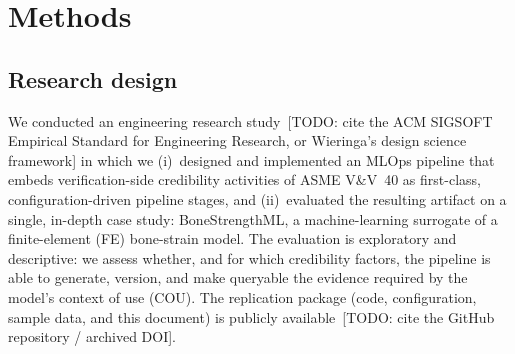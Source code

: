 %
%

\section{Methods}
\label{sec:methods}

\subsection{Research design}
\label{sec:methods:design}

We conducted an engineering research study~[TODO: cite the ACM SIGSOFT
Empirical Standard for Engineering Research, or Wieringa's design science
framework] in which we (i)~designed and implemented an MLOps pipeline that
embeds verification-side credibility activities of ASME V\&V~40 as
first-class, configuration-driven pipeline stages, and (ii)~evaluated the
resulting artifact on a single, in-depth case study: BoneStrengthML, a
machine-learning surrogate of a finite-element (FE) bone-strain model.
The evaluation is exploratory and descriptive: we assess whether, and for
which credibility factors, the pipeline is able to generate, version, and make
queryable the evidence required by the model's context of use (COU).
The replication package (code, configuration, sample data, and this
document) is publicly available~[TODO: cite the GitHub repository / archived
DOI].

